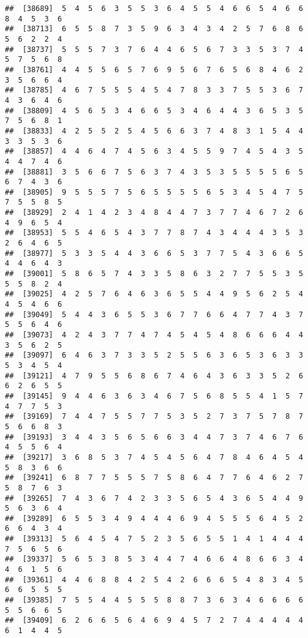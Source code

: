 \documentclass[
]{book}
\begin{document}
\begin{verbatim}
##  [38689]  5  4  5  6  3  5  5  3  6  4  5  5  4  6  6  5  4  6  6  8  4  5  3  6
##  [38713]  6  5  5  8  7  3  5  9  6  3  4  3  4  2  5  7  6  8  6  5  6  2  2  4
##  [38737]  5  5  5  7  3  7  6  4  4  6  5  6  7  3  3  5  3  7  4  5  7  5  6  8
##  [38761]  4  4  5  5  6  5  7  6  9  5  6  7  6  5  6  8  4  6  2  3  5  6  6  4
##  [38785]  4  6  7  5  5  5  4  5  4  7  8  3  3  7  5  5  3  6  7  4  3  6  4  6
##  [38809]  4  5  6  5  3  4  6  6  5  3  4  6  4  4  3  6  5  3  5  7  5  6  8  1
##  [38833]  4  2  5  5  2  5  4  5  6  6  3  7  4  8  3  1  5  4  4  3  3  5  3  6
##  [38857]  4  4  6  4  7  4  5  6  3  4  5  5  9  7  4  5  4  3  5  4  4  7  4  6
##  [38881]  3  5  6  6  7  5  6  3  7  4  3  5  3  5  5  5  5  6  5  6  7  4  3  6
##  [38905]  9  5  5  5  7  5  6  5  5  5  5  6  5  3  4  5  4  7  5  7  5  5  8  5
##  [38929]  2  4  1  4  2  3  4  8  4  4  7  3  7  7  4  6  7  2  6  4  9  6  5  4
##  [38953]  5  5  4  6  5  4  3  7  7  8  7  4  3  4  4  4  3  5  3  2  6  4  6  5
##  [38977]  5  3  3  5  4  4  3  6  6  5  3  7  7  5  4  3  6  6  5  4  4  6  4  3
##  [39001]  5  8  6  5  7  4  3  3  5  8  6  3  2  7  7  5  5  3  5  5  5  8  2  4
##  [39025]  4  2  5  7  6  4  6  3  6  5  5  4  4  9  5  6  2  5  4  4  5  4  6  6
##  [39049]  5  4  4  3  6  5  5  3  6  7  7  6  6  4  7  7  4  3  7  5  5  6  4  6
##  [39073]  4  2  4  3  7  7  4  7  4  5  4  5  4  8  6  6  6  4  4  3  5  6  2  5
##  [39097]  6  4  6  3  7  3  3  5  2  5  5  6  3  6  5  3  6  3  3  5  3  4  5  4
##  [39121]  4  7  9  5  5  6  8  6  7  4  6  4  3  6  3  3  5  2  6  6  2  6  5  5
##  [39145]  9  4  4  6  3  6  3  4  6  7  5  6  8  5  5  4  1  5  7  4  7  7  5  3
##  [39169]  7  4  4  7  5  5  7  7  5  3  5  2  7  3  7  5  7  8  7  5  6  6  8  3
##  [39193]  3  4  4  3  5  6  5  6  6  3  4  4  7  3  7  4  6  7  6  4  5  5  6  4
##  [39217]  3  6  8  5  3  7  4  5  4  5  6  4  7  8  4  6  4  5  4  5  8  3  6  6
##  [39241]  6  8  7  7  5  5  5  7  5  8  6  4  7  7  6  4  6  2  7  5  8  7  6  3
##  [39265]  7  4  3  6  7  4  2  3  3  5  6  5  4  3  6  5  4  4  9  5  6  3  6  4
##  [39289]  6  5  5  3  4  9  4  4  4  6  9  4  5  5  5  6  4  5  2  6  6  4  3  4
##  [39313]  5  6  4  5  4  7  5  2  3  5  6  5  5  1  4  1  4  4  4  7  5  6  5  6
##  [39337]  5  6  5  3  8  5  3  4  4  7  4  6  6  4  8  6  6  3  4  4  6  1  5  6
##  [39361]  4  4  6  8  8  4  2  5  4  2  6  6  6  5  4  8  3  4  5  6  6  5  5  5
##  [39385]  7  5  5  4  4  5  5  5  8  8  7  3  6  3  4  6  6  6  6  5  5  6  6  5
##  [39409]  6  2  6  6  5  6  4  6  9  4  5  7  2  7  4  4  4  4  4  6  1  4  4  5

\end{verbatim}
\end{document}
